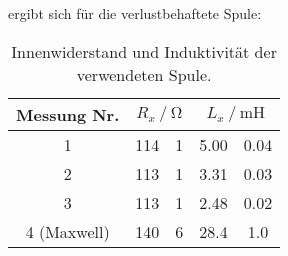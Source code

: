     ergibt sich für die verlustbehaftete Spule: 
    \begin{table}
        \centering
        \caption{Innenwiderstand und Induktivität der verwendeten Spule.}
        \label{tab:R_L_Spule}
        \begin{tabular}{c S[table-format=3.0] @{${}\pm{}$} S[table-format=1.0] S[table-format=2.2] @{${}\pm{}$} S[table-format=1.2]}
            \toprule
            {Messung Nr.} &  &  \\
                       & 114 & 1 & 5.00 & 0.04 \\
            2           & 113 & 1 & 3.31 & 0.03 \\
            3           & 113 & 1 & 2.48 & 0.02 \\
            4 (Maxwell) & 140 & 6 & 28.4 & 1.0  \\ %
            \bottomrule
        \end{tabular}
    \end{table}

